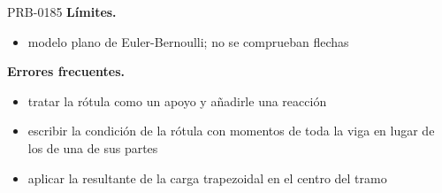 \begin{studiumworked}{PRB-0185}
\textbf{Límites.}\begin{itemize}\item modelo plano de Euler-Bernoulli; no se comprueban flechas\end{itemize}

\textbf{Errores frecuentes.}\begin{itemize}\item tratar la rótula como un apoyo y añadirle una reacción
\item escribir la condición de la rótula con momentos de toda la viga en lugar de los de una de sus partes
\item aplicar la resultante de la carga trapezoidal en el centro del tramo\end{itemize}

\end{studiumworked}

\Needspace{.3\textheight}

